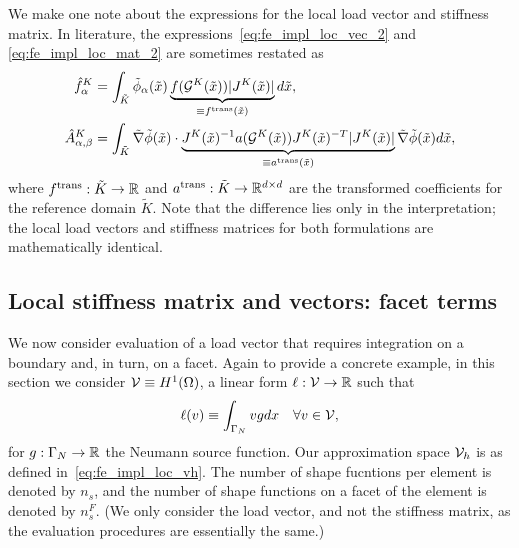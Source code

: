 We make one note about the expressions for the local load vector and stiffness matrix.  In literature, the expressions~\eqref{eq:fe_impl_loc_vec_2} and \eqref{eq:fe_impl_loc_mat_2} are sometimes restated as
\begin{align*}
  \hat f^K_\alpha
  &=
  \int_{\tilde K} \tilde \phi_\alpha(\tilde x) \underbrace{ f(\mathcal{G}^K(\tilde x)) |J^K(\tilde x)| }_{\equiv f^{\rm trans}(\tilde x)}d \tilde x, \\
  \hat A^K_{\alpha,\beta}
  &=
  \int_{\tilde K} \tilde \nabla \tilde \phi(\tilde x)
  \cdot  \underbrace{ J^K(\tilde x)^{-1} a(\mathcal{G}^K(\tilde x)) J^K(\tilde x)^{-T} |J^K(\tilde x)| }_{\equiv  a^{\rm trans}(\tilde x)}\tilde \nabla \tilde \phi(\tilde x)  d\tilde x,
\end{align*}
where $f^{\rm trans}: \tilde K \to \mathbb{R}$  and $a^{\rm trans}:\tilde K \to \mathbb{R}^{d \times d}$ are the transformed coefficients for the reference domain $\tilde K$. Note that the difference lies only in the interpretation; the local load vectors and stiffness matrices for both formulations are mathematically identical.

\subsection{Local stiffness matrix and vectors: facet terms}
\label{sec:fe_impl_assembly_facet}
We now consider evaluation of a load vector that requires integration on a boundary and, in turn, on a facet.  Again to provide a concrete example, in this section we consider $\mathcal{V} \equiv H^1(\Omega)$, a linear form $\ell: \mathcal{V} \to \mathbb{R}$ such that
\begin{equation}
  \ell(v) \equiv \int_{\Gamma_N} v g dx \quad \forall v \in \mathcal{V},
  \label{eq:fe_impl_model_g}
\end{equation}
for $g: \Gamma_N \to \mathbb{R}$ the Neumann source function. Our approximation space $\mathcal{V}_h$ is as defined in~\eqref{eq:fe_impl_loc_vh}.  The number of shape fucntions per element is denoted by $n_s$, and the number of shape functions on a facet of the element is denoted by $n_s^F$.  (We only consider the load vector, and not the stiffness matrix, as the evaluation procedures are essentially the same.)

